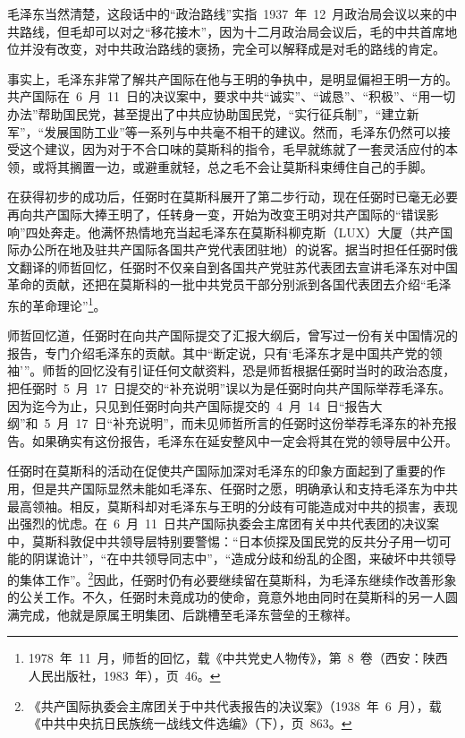 毛泽东当然清楚，这段话中的“政治路线”实指~1937~年~12~月政治局会议以来的中共路线，但毛却可以对之“移花接木”，因为十二月政治局会议后，毛的中共首席地位并没有改变，对中共政治路线的褒扬，完全可以解释成是对毛的路线的肯定。

事实上，毛泽东非常了解共产国际在他与王明的争执中，是明显偏袒王明一方的。共产国际在~6~月~11~日的决议案中，要求中共“诚实”、“诚恳”、“积极”、“用一切办法”帮助国民党，甚至提出了中共应协助国民党，“实行征兵制”，“建立新军”，“发展国防工业”等一系列与中共毫不相干的建议。然而，毛泽东仍然可以接受这个建议，因为对于不合口味的莫斯科的指令，毛早就练就了一套灵活应付的本领，或将其搁置一边，或避重就轻，总之毛不会让莫斯科束缚住自己的手脚。

在获得初步的成功后，任弼时在莫斯科展开了第二步行动，现在任弼时已毫无必要再向共产国际大捧王明了，任转身一变，开始为改变王明对共产国际的“错误影响”四处奔走。他满怀热情地充当起毛泽东在莫斯科柳克斯（LUX）大厦（共产国际办公所在地及驻共产国际各国共产党代表团驻地）的说客。据当时担任任弼时俄文翻译的师哲回忆，任弼时不仅亲自到各国共产党驻苏代表团去宣讲毛泽东对中国革命的贡献，还把在莫斯科的一批中共党员干部分别派到各国代表团去介绍“毛泽东的革命理论”\footnote{1978~年~11~月，师哲的回忆，载《中共党史人物传》，第~8~卷（西安：陕西人民出版社，1983~年），页~46。}。

师哲回忆道，任弼时在向共产国际提交了汇报大纲后，曾写过一份有关中国情况的报告，专门介绍毛泽东的贡献。其中“断定说，只有‘毛泽东才是中国共产党的领袖’”。师哲的回忆没有引证任何文献资料，恐是师哲根据任弼时当时的政治态度，把任弼时~5~月~17~日提交的“补充说明”误以为是任弼时向共产国际举荐毛泽东。因为迄今为止，只见到任弼时向共产国际提交的~4~月~14~日“报告大纲”和~5~月~17~日“补充说明”，而未见师哲所言的任弼时这份举荐毛泽东的补充报告。如果确实有这份报告，毛泽东在延安整风中一定会将其在党的领导层中公开。

任弼时在莫斯科的活动在促使共产国际加深对毛泽东的印象方面起到了重要的作用，但是共产国际显然未能如毛泽东、任弼时之愿，明确承认和支持毛泽东为中共最高领袖。相反，莫斯科却对毛泽东与王明的分歧有可能造成对中共的损害，表现出强烈的忧虑。在~6~月~11~日共产国际执委会主席团有关中共代表团的决议案中，莫斯科敦促中共领导层特别要警惕：“日本侦探及国民党的反共分子用一切可能的阴谋诡计”，“在中共领导同志中”，“造成分歧和纷乱的企图，来破坏中共领导的集体工作”。\footnote{《共产国际执委会主席团关于中共代表报告的决议案》（1938~年~6~月），载《中共中央抗日民族统一战线文件选编》（下），页~863。}因此，任弼时仍有必要继续留在莫斯科，为毛泽东继续作改善形象的公关工作。不久，任弼时未竟成功的使命，竟意外地由同时在莫斯科的另一人圆满完成，他就是原属王明集团、后跳槽至毛泽东营垒的王稼祥。

